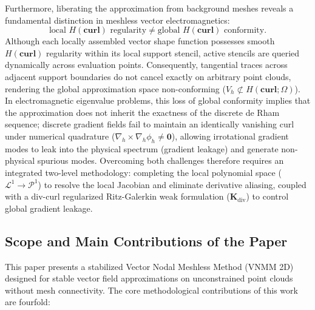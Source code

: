 \documentclass[preprint,12pt]{elsarticle}
\begin{document}
Furthermore, liberating the approximation from background meshes reveals a fundamental distinction in meshless vector electromagnetics:
\begin{equation}
\boxed{\text{local } H(\mathbf{curl}) \text{ regularity} \neq \text{global } H(\mathbf{curl}) \text{ conformity}.}
\label{eq:local_reg_vs_global_conf}
\end{equation}
Although each locally assembled vector shape function possesses smooth $H(\mathbf{curl})$ regularity within its local support stencil, active stencils are queried dynamically across evaluation points. Consequently, tangential traces across adjacent support boundaries do not cancel exactly on arbitrary point clouds, rendering the global approximation space non-conforming ($V_h \not\subset H(\mathbf{curl}; \Omega)$). In electromagnetic eigenvalue problems, this loss of global conformity implies that the approximation does not inherit the exactness of the discrete de Rham sequence; discrete gradient fields fail to maintain an identically vanishing curl under numerical quadrature ($\nabla_h \times \nabla_h \phi_h \neq \mathbf{0}$), allowing irrotational gradient modes to leak into the physical spectrum (gradient leakage) and generate non-physical spurious modes. Overcoming both challenges therefore requires an integrated two-level methodology: completing the local polynomial space ($\mathcal{L}^1 \to \mathcal{P}^1$) to resolve the local Jacobian and eliminate derivative aliasing, coupled with a div-curl regularized Ritz-Galerkin weak formulation ($\mathbf{K}_{\mathrm{div}}$) to control global gradient leakage.

\subsection{Scope and Main Contributions of the Paper}
\label{subsec:scope_contributions}
This paper presents a stabilized Vector Nodal Meshless Method (VNMM 2D) designed for stable vector field approximations on unconstrained point clouds without mesh connectivity. The core methodological contributions of this work are fourfold:
\end{document}
